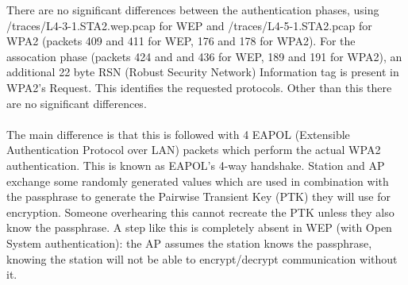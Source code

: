 There are no significant differences between the authentication phases, using /traces/L4-3-1.STA2.wep.pcap for WEP and /traces/L4-5-1.STA2.pcap for WPA2 (packets 409 and 411 for WEP, 176 and 178 for WPA2). For the assocation phase (packets 424 and and 436 for WEP, 189 and 191 for WPA2), an additional 22 byte RSN (Robust Security Network) Information tag is present in WPA2's Request. This identifies the requested protocols. Other than this there are no significant differences. \\ \\The main difference is that this is followed with 4 EAPOL (Extensible Authentication Protocol over LAN) packets which perform the actual WPA2 authentication. This is known as EAPOL's 4-way handshake. Station and AP exchange some randomly generated values which are used in combination with the passphrase to generate the Pairwise Transient Key (PTK) they will use for encryption. Someone overhearing this cannot recreate the PTK unless they also know the passphrase. A step like this is completely absent in WEP (with Open System authentication): the AP assumes the station knows the passphrase, knowing the station will not be able to encrypt/decrypt communication without it.

